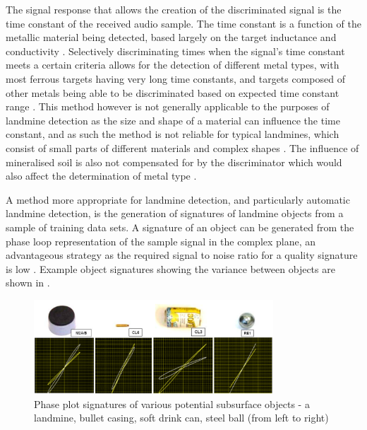 \documentclass[main.tex]{subfiles}
\begin{document}
The signal response that allows the creation of the discriminated signal is the time constant of the received audio sample. The time constant is a function of the metallic material being detected, based largely on the target inductance and conductivity \parencite{Candy2008}. Selectively discriminating times when the signal's time constant meets a certain criteria allows for the detection of different metal types, with most ferrous targets having very long time constants, and targets composed of other metals being able to be discriminated based on expected time constant range \parencite{Candy2008}. This method however is not generally applicable to the purposes of landmine detection as the size and shape of a material can influence the time constant, and as such the method is not reliable for typical landmines, which consist of small parts of different materials and complex shapes \parencite{Kruger2006}. The influence of mineralised soil is also not compensated for by the discriminator which would also affect the determination of metal type \parencite{Kruger2006}.

A method more appropriate for landmine detection, and particularly automatic landmine detection, is the generation of signatures of landmine objects from a sample of training data sets. A signature of an object can be generated from the phase loop representation of the sample signal in the complex plane, an advantageous strategy as the required signal to noise ratio for a quality signature is low \parencite{Kruger2006}. Example object signatures showing the variance between objects are shown in .
\begin{figure}[ht]
\includegraphics[width=0.8\textwidth]{2-LiteratureReview/signature.png}
\centering
\caption[Phase plot signatures of various potential subsurface objects]{Phase plot signatures of various potential subsurface objects - a landmine, bullet casing, soft drink can, steel ball (from left to right) \parencite{Kruger2006}} 
\end{figure}
\end{document}
